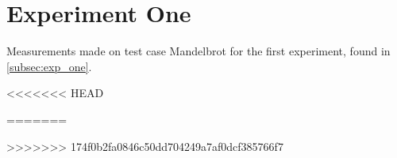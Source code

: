 \section{Experiment One}\label{app:exp_one}

Measurements made on test case Mandelbrot for the first experiment, found in \cref{subsec:exp_one}.

% 
% 
<<<<<<< HEAD






=======
%

%
%
%
>>>>>>> 174f0b2fa0846c50dd704249a7af0dcf385766f7

